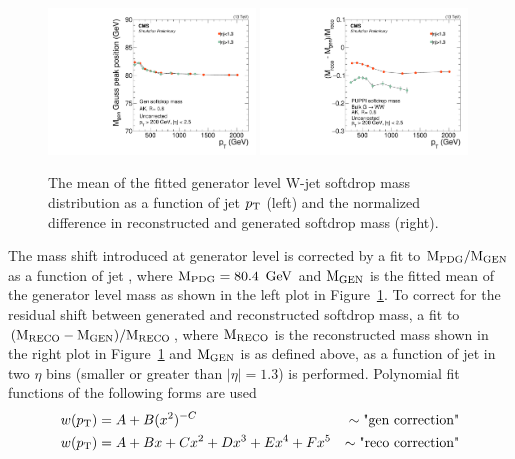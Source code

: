 \begin{figure}[htbp]
\centering
\includegraphics[width=0.49\textwidth]{figures/analysis/search2/AN-16-235/plots/GenSoftdropMass_vspt.pdf}
\includegraphics[width=0.49\textwidth]{figures/analysis/search2/AN-16-235/plots/MassShift_vspt.pdf}
\caption{The mean of the fitted generator level W-jet softdrop mass distribution as a function of jet $p_{\mathrm{T}}$ (left) and the normalized difference in reconstructed and generated softdrop mass (right).}
\label{fig:searchII:sdmassshifts}
\end{figure}

The mass shift introduced at generator level is corrected by a fit to $\rm{M_{PDG}/M_{GEN}}$ as a function of jet \PT, where $\rm{M_{PDG}}=80.4~\,\text{Ge\hspace{-.08em}V}$ and $\rm{M_{GEN}}$ is the fitted mean of the generator level mass as shown in the left plot in Figure~\ref{fig:searchII:sdmassshifts}. To correct for the residual shift between generated and reconstructed softdrop mass, a fit to $\rm{(M_{RECO}-M_{GEN})/M_{RECO}}$, where $\rm{M_{RECO}}$ is the reconstructed mass shown in the right plot in Figure~\ref{fig:searchII:sdmassshifts} and $\rm{M_{GEN}}$ is as defined above, as a function of jet \PT in two $\eta$ bins (smaller or greater than $|\eta|=1.3$) is performed.
Polynomial fit functions of the following forms are used
\begin{align*} 
w(p_{\mathrm{T}}) &=  A  +B(x^{2})^{-C}          &\sim\textrm{"gen correction"}\\ 
w(p_{\mathrm{T}}) &=  A  +Bx+Cx^2+Dx^3+Ex^4+Fx^5 &\sim\textrm{"reco correction"} 
\end{align*}

